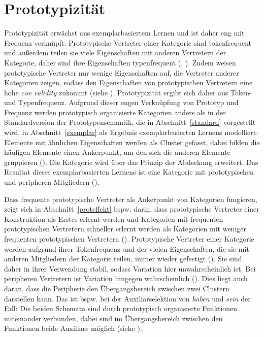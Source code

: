 \section{Prototypizität}

Prototypizität erwächst aus exemplarbasiertem Lernen und ist daher eng mit Frequenz verknüpft: Prototypische Vertreter einer Kategorie sind tokenfrequent und außerdem teilen sie viele Eigenschaften mit anderen Vertretern der Kategorie, daher sind ihre Eigenschaften typenfrequent (\cite[85]{Ellis.2014}, \cite[564]{Taylor.2015}). Zudem weisen  prototypische Vertreter nur wenige Eigenschaften auf, die Vertreter anderer Kategorien zeigen, sodass den Eigenschaften von prototypischen Vertretern eine hohe \textit{cue validity} zukommt (siehe ). Prototypizität ergibt sich daher aus Token- und Typenfrequenz. Aufgrund dieser engen Verknüpfung von Prototyp und Frequenz werden prototypisch organisierte Kategorien anders als in der Standardversion der Prototypensemantik, die in Abschnitt~\ref{standard} vorgestellt wird, in Abschnitt~\ref{exemplar} als Ergebnis exemplarbasierten Lernens modelliert: Elemente mit ähnlichen Eigenschaften werden als Cluster gefasst, dabei bilden die häufigen Elemente einen Ankerpunkt, um den sich die anderen Elemente gruppieren (\cites[89]{Goldberg.2006}[242]{Ellis.2016}[51--73]{Goldberg.2019}). Die Kategorie wird über das Prinzip der Abdeckung erweitert. Das Resultat dieses exemplarbasierten Lernens ist eine Kategorie mit prototypischen und peripheren Mitgliedern (\cite[216--222]{Ross.1999}). 

  
Dass frequente prototypische Vertreter als Ankerpunkt von Kategorien fungieren, zeigt sich in Abschnitt~\ref{proteffekt} bspw. darin, dass prototypische Vertreter einer Konstruktion als Erstes erlernt werden und Kategorien mit frequenten prototypischen Vertretern  schneller erlernt werden als Kategorien mit weniger frequenten prototypischen Vertretern (\cites[198--200]{Goldberg.2006}{Ellis.2009}[58]{Ellis.2014}). Prototypische Vertreter einer Kategorie werden aufgrund ihrer Tokenfrequenz und der vielen Eigenschaften, die sie mit anderen Mitgliedern der Kategorie teilen, immer wieder gefestigt (\cite[85]{Ellis.2014}). Sie sind daher in ihrer Verwendung stabil, sodass Variation hier unwahrscheinlich ist. Bei peripheren Vertretern ist Variation hingegen wahrscheinlich (\cite[67--68]{Agel.2008}). Dies liegt auch daran, dass die Peripherie den Übergangsbereich zwischen zwei Clustern darstellen kann. Das ist bspw. bei der Auxiliarselektion von \textit{haben} und \textit{sein} der Fall: Die beiden Schemata sind durch prototypisch organisierte Funktionen miteinander verbunden, dabei sind im Übergangsbereich zwischen den Funktionen beide Auxiliare möglich (siehe ).  


